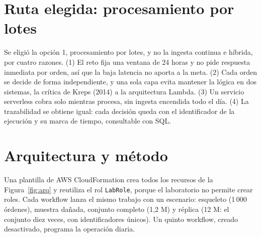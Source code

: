 \documentclass[10pt,twocolumn,letterpaper]{article}
\begin{document}
\section{Ruta elegida: procesamiento por lotes}
Se eligió la opción 1, procesamiento por lotes, y no la ingesta continua e híbrida, por cuatro razones. (1) El reto fija una ventana de 24 horas y no pide respuesta inmediata por orden, así que la baja latencia no aporta a la meta. (2) Cada orden se decide de forma independiente, y una sola capa evita mantener la lógica en dos sistemas, la crítica de Kreps (2014) a la arquitectura Lambda. (3) Un servicio serverless cobra solo mientras procesa, sin ingesta encendida todo el día. (4) La trazabilidad se obtiene igual: cada decisión queda con el identificador de la ejecución y su marca de tiempo, consultable con SQL.

\section{Arquitectura y método}
Una plantilla de AWS CloudFormation crea todos los recursos de la Figura~\ref{fig:arq} y reutiliza el rol \texttt{LabRole}, porque el laboratorio no permite crear roles. Cada workflow lanza el mismo trabajo con un escenario: esqueleto (1\,000 órdenes), muestra dañada, conjunto completo (1,2 M) y réplica (12 M: el conjunto diez veces, con identificadores únicos). Un quinto workflow, creado desactivado, programa la operación diaria.
\end{document}
